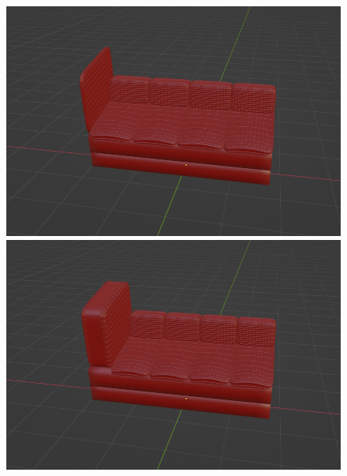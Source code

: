 \begin{figure}[h]
 \begin{minipage}[b]{0.48\linewidth}
  \centering
  \includegraphics[scale=0.17]{./imgs/sofaParamMean/sideCushionTickMin.png}
 \end{minipage}
 \begin{minipage}[b]{0.48\linewidth}
  \centering
  \includegraphics[scale=0.17]{./imgs/sofaParamMean/sideCushionTickMax.png}
 \end{minipage}\\
 \begin{minipage}[b]{0.48\linewidth}
  \centering

\end{minipage}
\end{figure}
